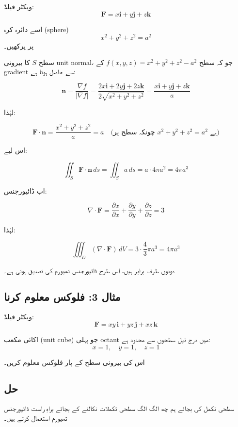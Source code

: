 \begin{enumerate}
ویکٹر فیلڈ:
\[
\mathbf{F} = x\mathbf{i} + y\mathbf{j} + z\mathbf{k}
\]

اسے دائرہ کرہ (sphere)
\[
x^2 + y^2 + z^2 = a^2
\]
پر پرکھیں۔

\bigskip

سطح \( S \) کا بیرونی unit normal، جو کہ سطح \( f(x,y,z)=x^2+y^2+z^2-a^2 \) کے gradient سے حاصل ہوتا ہے:

\[
\mathbf{n}
=
\frac{\nabla f}{|\nabla f|}
=
\frac{2x\mathbf{i}+2y\mathbf{j}+2z\mathbf{k}}{2\sqrt{x^2+y^2+z^2}}
=
\frac{x\mathbf{i}+y\mathbf{j}+z\mathbf{k}}{a}
\]

لہٰذا:

\[
\mathbf{F}\cdot \mathbf{n}
=
\frac{x^2+y^2+z^2}{a}
=
a
\quad \text{(چونکہ سطح پر } x^2+y^2+z^2=a^2\text{ ہے)}
\]

اس لیے:

\[
\iint_S \mathbf{F}\cdot \mathbf{n}\, ds
=
\iint_S a\, ds
=
a \cdot 4\pi a^2
=
4\pi a^3
\]

\bigskip

اب ڈائیورجنس:

\[
\nabla \cdot \mathbf{F}
=
\frac{\partial x}{\partial x}
+
\frac{\partial y}{\partial y}
+
\frac{\partial z}{\partial z}
=
3
\]

لہٰذا:

\[
\iiint_D (\nabla \cdot \mathbf{F})\, dV
=
3 \cdot \frac{4}{3}\pi a^3
=
4\pi a^3
\]

دونوں طرف برابر ہیں، اس طرح ڈائیورجنس تھیورم کی تصدیق ہوتی ہے۔

\bigskip

\subsection*{مثال 3: فلوکس معلوم کرنا}

ویکٹر فیلڈ:
\[
\mathbf{F} = xy\,\mathbf{i} + yz\,\mathbf{j} + xz\,\mathbf{k}
\]

اکائی مکعب (unit cube) جو پہلی octant میں درج ذیل سطحوں سے محدود ہے:
\[
x=1,\quad y=1,\quad z=1
\]

اس کی بیرونی سطح کے پار فلوکس معلوم کریں۔


\subsection*{حل}

سطحی تکمل کی بجائے ہم چھ الگ الگ سطحی تکملات نکالنے کے بجائے براہِ راست ڈائیورجنس تھیورم استعمال کرتے ہیں۔


\end{enumerate}
